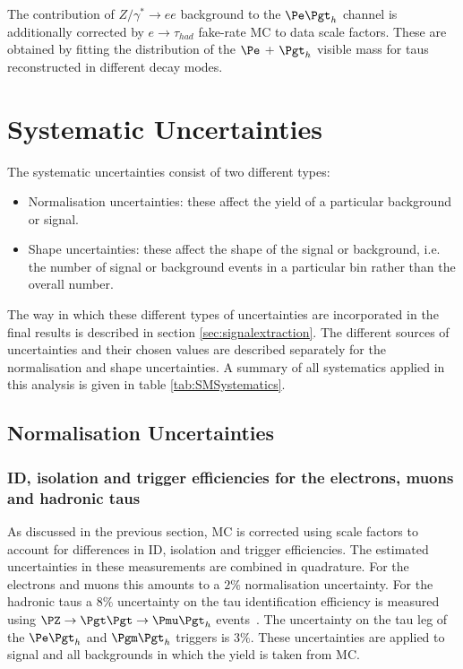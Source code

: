 The contribution of $Z/\gamma^{*} \to ee$ background to the $\etau$ channel
is additionally corrected by $e \to \tau_{had}$ fake-rate \ac{MC} to data
scale factors. These are obtained by fitting the distribution of the $\Pe$ +
$\Pgt_{h}$ visible mass for taus reconstructed in different decay modes. 

\section{Systematic Uncertainties}
\label{sec:systematics}

The systematic uncertainties consist of two different types:

\begin{itemize} 
\item Normalisation uncertainties: these affect the yield of a particular background or
signal.
\item Shape uncertainties: these affect the shape of the signal or background,
i.e. the number of signal or background events in a particular bin rather
than the overall number.
\end{itemize}

The way in which these different types of uncertainties are incorporated in the
final results is described in section \ref{sec:signalextraction}. The different
sources of uncertainties and their chosen values are described separately for the 
normalisation and shape uncertainties. A summary of all systematics applied in
this analysis is given in table \ref{tab:SMSystematics}.

\subsection{Normalisation Uncertainties}
\label{sec:systematicUncertainties_yield}

\subsubsection{\textbf{ID, isolation and trigger efficiencies for the electrons, muons and
hadronic taus}}
As discussed in the previous section, \ac{MC} is corrected using scale factors
to account for differences in ID, isolation and trigger efficiencies. The
estimated uncertainties in these measurements are combined in quadrature. 
For the electrons and muons this amounts to a $2\%$ normalisation uncertainty.
For the hadronic taus a $8\%$ uncertainty on the tau identification efficiency
is measured using $\PZ \to \Pgt\Pgt \to \Pmu\Pgth$ events~\cite{Chatrchyan:2012zz}. 
The uncertainty on the tau leg of the $\etau$ and $\mutau$ triggers is $3\%$.
These uncertainties are applied to signal and all backgrounds in which the yield
is taken from \ac{MC}.

